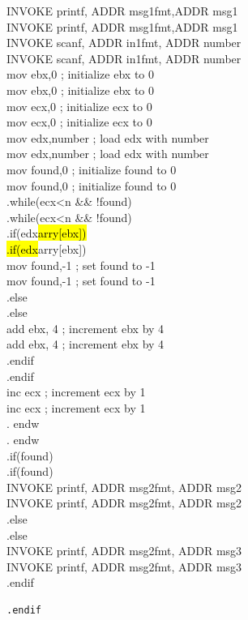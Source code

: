 \documentclass[10pt]{book}
\begin{document}
\begin{center}
\begin{center}
INVOKE printf, ADDR msg1fmt,ADDR msg1\\
INVOKE printf, ADDR msg1fmt,ADDR msg1\\
INVOKE scanf, ADDR in1fmt, ADDR number\\
INVOKE scanf, ADDR in1fmt, ADDR number\\
mov ebx,0 ; initialize ebx to 0\\
mov ebx,0 ; initialize ebx to 0\\
mov ecx,0 ; initialize ecx to 0\\
mov ecx,0 ; initialize ecx to 0\\
mov edx,number ; load edx with number\\
mov edx,number ; load edx with number\\
mov found,0 ; initialize found to 0\\
mov found,0 ; initialize found to 0\\
.while(ecx<n \&\& !found)\\
.while(ecx<n \&\& !found)\\
.if(edx\hl{arry[ebx])\\
.if(edx}arry[ebx])\\
mov found,-1 ; set found to -1\\
mov found,-1 ; set found to -1\\
.else\\
.else\\
add ebx, 4 ; increment ebx by 4\\
add ebx, 4 ; increment ebx by 4\\
.endif\\
.endif\\
inc ecx ; increment ecx by 1\\
inc ecx ; increment ecx by 1\\
. endw\\
. endw\\
.if(found)\\
.if(found)\\
INVOKE printf, ADDR msg2fmt, ADDR msg2\\
INVOKE printf, ADDR msg2fmt, ADDR msg2\\
.else\\
.else\\
INVOKE printf, ADDR msg2fmt, ADDR msg3\\
INVOKE printf, ADDR msg2fmt, ADDR msg3\\
.endif

\begin{verbatim}
.endif
\end{verbatim}


\end{center}
\end{center}
\end{document}

